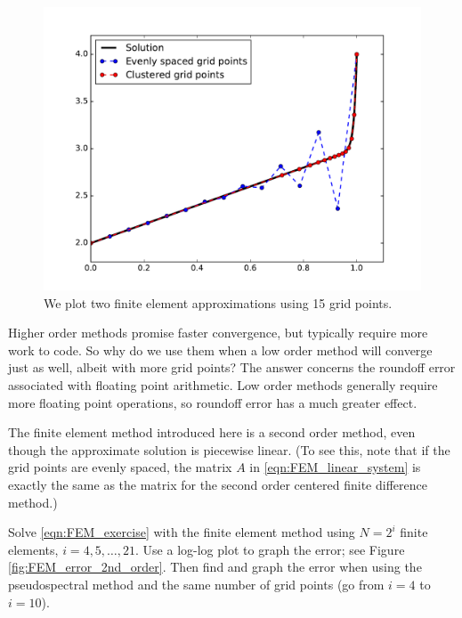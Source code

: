 \begin{figure}[ht]
\centering
\includegraphics[width=\textwidth]{FEM_compare_methods.pdf}
\caption{We plot two finite element approximations using 15 grid points. }
\label{fig:FEM_compare_methods}
\end{figure}

\begin{problem}
\label{prob:FEM_accuracy_comparison}
Higher order methods promise faster convergence, but typically require more work to code.
So why do we use them when a low order method will converge just as well, albeit with more grid points?
The answer concerns the roundoff error associated with floating point arithmetic.
Low order methods generally require more floating point operations, so roundoff error has a much greater effect.

The finite element method introduced here is a second order method, even though the approximate solution is piecewise linear.
(To see this, note that if the grid points are evenly spaced, the matrix $A$ in \eqref{eqn:FEM_linear_system} is exactly the same as the matrix for the second order centered finite difference method.)

Solve \eqref{eqn:FEM_exercise} with the finite element method using $N = 2^i$  finite elements, $i = 4, 5, \ldots, 21$.
Use a log-log plot to graph the error; see Figure \ref{fig:FEM_error_2nd_order}.
Then find and graph the error when using the pseudospectral method and the same number of grid points (go from $i = 4$ to $i = 10$).
\end{problem}



